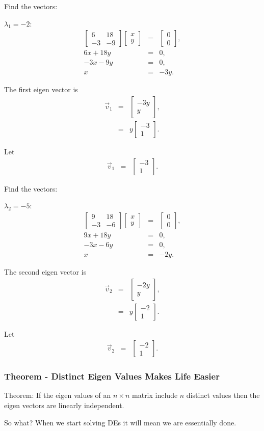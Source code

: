 \documentclass{beamer}
\newcommand{\arrayTwo}[4]{
  \left[
  \begin{array}{rr}
    #1 & #2 \\
    #3 & #4
  \end{array}
  \right]
}
\newcommand{\vecTwo}[2]{
  \left[
  \begin{array}{r}
    #1 \\  #2
  \end{array}
  \right]
}
\begin{document}
\begin{frame}
  Find the vectors:

  $\lambda_1 = -2$:
  \begin{eqnarray*}
    \arrayTwo{6}{18}{-3}{-9} \vecTwo{x}{y} & = & \vecTwo{0}{0}, \\
    6x + 18y & = & 0, \\
    -3x - 9y & = & 0, \\
    x & = & -3y.
  \end{eqnarray*}

  The first eigen vector is 
  \begin{eqnarray*}
    \vec{v}_1 & = & \vecTwo{-3y}{y}, \\
    & = & y \vecTwo{-3}{1}.
  \end{eqnarray*}

  Let
  \begin{eqnarray*}
    \vec{v}_1 & = & \vecTwo{-3}{1}.
  \end{eqnarray*}

\end{frame}

\begin{frame}
  Find the vectors:

  $\lambda_2 = -5$:
  \begin{eqnarray*}
    \arrayTwo{9}{18}{-3}{-6} \vecTwo{x}{y} & = & \vecTwo{0}{0}, \\
    9x + 18y & = & 0, \\
    -3x - 6y & = & 0, \\
    x & = & -2 y.
  \end{eqnarray*}

  The second eigen vector is 
  \begin{eqnarray*}
    \vec{v}_2 & = & \vecTwo{-2y}{y}, \\
    & = & y \vecTwo{-2}{1}.
  \end{eqnarray*}

  Let
  \begin{eqnarray*}
    \vec{v}_2 & = & \vecTwo{-2}{1}.
  \end{eqnarray*}

\end{frame}



\begin{frame}
  \frametitle{Theorem - Distinct Eigen Values Makes Life Easier}

  Theorem: If the eigen values of an $n\times n$ matrix include $n$
  distinct values then the eigen vectors are linearly independent.

  \vfill

  {
    So what? When we start solving DEs it will mean we are essentially
    done. 
  }

  \vfill

\end{frame}
\end{document}
